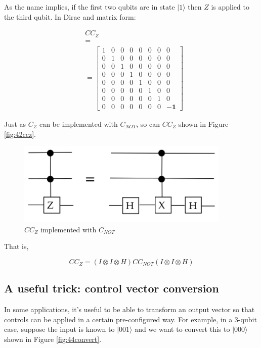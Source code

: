 \documentclass[main.tex]{subfiles}
\begin{document}
    As the name implies, if the first two qubits are in state $|1\rangle$ then $Z$ is applied to the third qubit. In Dirac and matrix form:
    
    $$
    \begin{aligned}
    &C C_{Z} \\
    &= \\
    &=\left[\begin{array}{lllllllc}
    1 & 0 & 0 & 0 & 0 & 0 & 0 & 0 \\
    0 & 1 & 0 & 0 & 0 & 0 & 0 & 0 \\
    0 & 0 & 1 & 0 & 0 & 0 & 0 & 0 \\
    0 & 0 & 0 & 1 & 0 & 0 & 0 & 0 \\
    0 & 0 & 0 & 0 & 1 & 0 & 0 & 0 \\
    0 & 0 & 0 & 0 & 0 & 1 & 0 & 0 \\
    0 & 0 & 0 & 0 & 0 & 0 & 1 & 0 \\
    0 & 0 & 0 & 0 & 0 & 0 & 0 & -\mathbf{1}
    \end{array}\right]
    \end{aligned}
    $$
    
    Just as $C_{Z}$ can be implemented with $C_{NOT}$, so can $CC_{Z}$ shown in Figure \ref{fig:42ccz}.
    
    \begin{figure}
        \centering
        \includegraphics[width=4in]{notes/figs/n08/43ccz2.png}
        \caption{$CC_{Z}$ implemented with $C_{NOT}$}
        \label{fig:43ccz2}
    \end{figure}
    
    That is,
    
    $$
    C C_{Z}=(I \otimes I \otimes H) C C_{NOT}(I \otimes I \otimes H)
    $$
    
\subsection{A useful trick: control vector conversion}

    In some applications, it's useful to be able to transform an output vector so that controls can be applied in a certain pre-configured way. For example, in a 3-qubit case, suppose the input is known to $|001\rangle$ and we want to convert this to $|000\rangle$ shown in Figure \ref{fig:44convert}.
    
\end{document}
